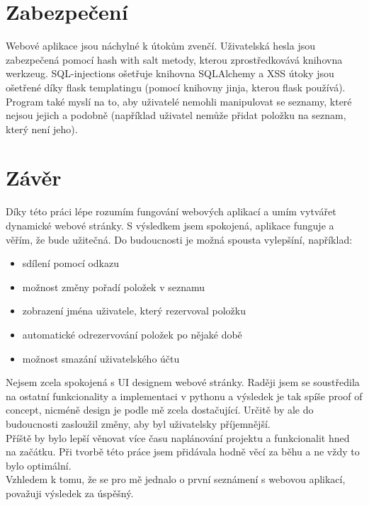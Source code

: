 \documentclass[czech]{pyt-report}
\begin{document}
\section{Zabezpečení}
Webové aplikace jsou náchylné k útokům zvenčí. Uživatelská hesla jsou zabezpečená pomocí hash with salt metody, kterou zprostředkovává knihovna werkzeug. SQL-injections ošetřuje knihovna SQLAlchemy a XSS útoky jsou ošetřené díky flask templatingu (pomocí knihovny jinja, kterou flask používá). Program také myslí na to, aby uživatelé nemohli manipulovat se seznamy, které nejsou jejich a podobně (například uživatel nemůže přidat položku na seznam, který není jeho).


\section{Závěr}
Díky této práci lépe rozumím fungování webových aplikací a umím vytvářet dynamické webové stránky. S výsledkem jsem spokojená, aplikace funguje a věřím, že bude užitečná. Do budoucnosti je možná spousta vylepšíní, například:
\begin{itemize}
  \item sdílení pomocí odkazu
  \item možnost změny pořadí položek v seznamu
  \item zobrazení jména uživatele, který rezervoval položku
  \item automatické odrezervování položek po nějaké době
  \item možnost smazání uživatelského účtu
\end{itemize}
Nejsem zcela spokojená s UI designem webové stránky. Raději jsem se soustředila na ostatní funkcionality a implementaci v pythonu a výsledek je tak spíše proof of concept, nicméně design je podle mě zcela dostačující. Určitě by ale do budoucnosti zasloužil změny, aby byl uživatelsky příjemnější.
\\
Příště by bylo lepší věnovat více času naplánování projektu a funkcionalit hned na začátku. Při tvorbě této práce jsem přidávala hodně věcí za běhu a ne vždy to bylo optimální.
\\
Vzhledem k tomu, že se pro mě jednalo o první seznámení s webovou aplikací, považuji výsledek za úspěšný.

\nocite{pyt_doc}
\nocite{flask_doc}
\nocite{flask_sql_alch}
\nocite{sql_alch}
\nocite{flask_login}
\nocite{login_readme}
\nocite{werk}
\nocite{waitress}
\nocite{uikit}
\nocite{htmx}
\nocite{lukas}
%

\end{document}
